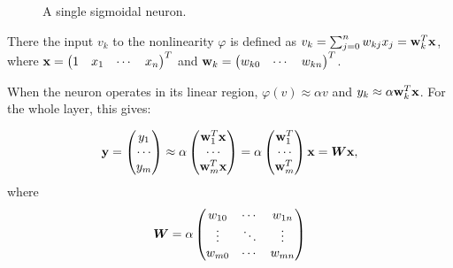 \begin{enumerate}
\begin{solution}
    \begin{figure}[hb]
      \begin{center}
        
        \caption{\label{fig:singleneuron} A single sigmoidal neuron.}
      \end{center}
    \end{figure}
    
    There the input $v_k$ to the nonlinearity $\varphi$ is defined as
    $v_k = \sum_{j = 0}^n w_{kj}x_j = {\bf{w}}_k^T {\bf{x}}$, \newline
    where ${\bf{x}}=\begin{pmatrix} 1 & x_1 &\cdots & x_n
    \end{pmatrix}^T$ and ${\bf{w}}_k=\begin{pmatrix} w_{k0} &\cdots &
      w_{kn} \end{pmatrix}^T$.

    When the neuron operates in its linear region, $\varphi(v) \approx
    \alpha v$ and $y_k \approx \alpha {\bf{w}}_k^T {\bf{x}}$. For the
    whole layer, this gives: 

    \begin{equation}
      {\bf{y}} = \begin{pmatrix}  y_1 \\ \cdots \\ y_m \end{pmatrix}
      \approx \alpha \begin{pmatrix}  {\bf{w}}_1^T {\bf{x}}\\ \cdots \\
        {\bf{w}}_m^T {\bf{x}} \end{pmatrix} 
      = \alpha \begin{pmatrix}  {\bf{w}}_1^T\\ \cdots \\
        {\bf{w}}_m^T \end{pmatrix} {\bf{x}} = \boldsymbol{W} {\bf{x}},
    \end{equation}
    where
    \begin{equation}
      \boldsymbol{W} = \alpha \begin{pmatrix}
        w_{10} & \cdots & w_{1n} \\ \vdots & \ddots & \vdots \\
        w_{m0} & \cdots & w_{mn} 
      \end{pmatrix}
    \end{equation}
    

\end{solution}
\end{enumerate}
